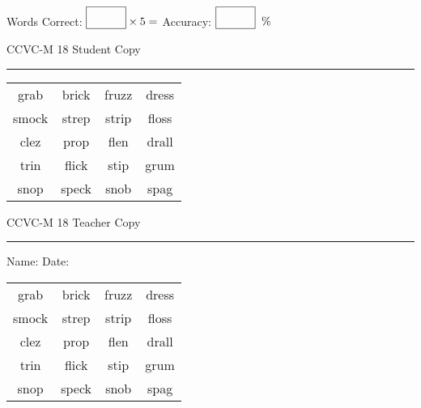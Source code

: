 \documentclass{memoir}
\begin{document}
\small

Words Correct: $\fbox{\phantom{\huge 100}} \times 5 = $ Accuracy: $\fbox{\phantom{\huge 100}}\;\; \%$ 

\vfill

\newpage


\footnotesize \noindent
CCVC-M 18 \hfill Student Copy
\smallskip
\hrule

\Large

\setlength{\tabcolsep}{14pt}
\def\arraystretch{3}

{\selectfont


\begin{vplace}[0.5]
\begin{center}
\begin{tabular}{cccc}
grab                    & brick       & fruzz & dress \\
smock & strep & strip & floss \\
clez & prop & flen & drall \\
trin & flick            & stip & grum       \\
snop & speck & snob & spag          \\
\end{tabular}
\end{center}
\end{vplace}

}

\newpage

\footnotesize \noindent
CCVC-M 18 \hfill Teacher Copy
\smallskip
\hrule

\small

\vfill

\noindent
Name: \underline{\hspace{1.75in}} \hfill Date: \underline{\hspace{1in}}

\Large

{\selectfont


\begin{vplace}[0.5]
\begin{center}
\begin{tabular}{cccc}
grab                    & brick       & fruzz & dress \\
smock & strep & strip & floss \\
clez & prop & flen & drall \\
trin & flick            & stip & grum       \\
snop & speck & snob & spag          \\
\end{tabular}
\end{center}
\end{vplace}



}
\end{document}
